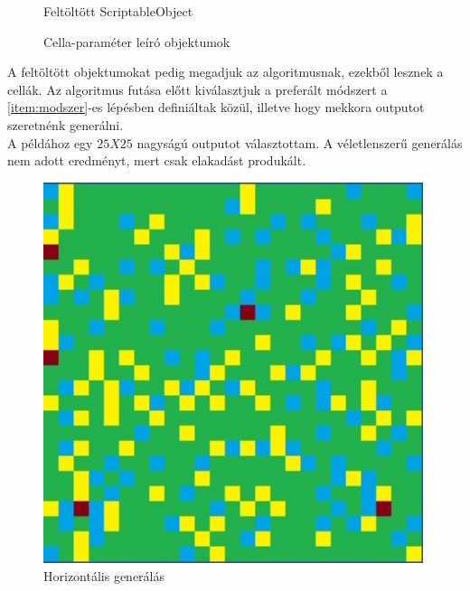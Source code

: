 \begin{figure}[h]
\begin{minipage}{.5\textwidth}
  \caption{Feltöltött ScriptableObject}
  \label{fig:teli-scriptable}
\end{minipage}
\caption*{Cella-paraméter leíró objektumok}
\end{figure}

A feltöltött objektumokat pedig megadjuk az algoritmusnak, ezekből lesznek a cellák.
\newpage
Az algoritmus futása előtt kiválasztjuk a preferált módszert a \ref{item:modszer}-es lépésben definiáltak közül, illetve hogy mekkora outputot szeretnénk generálni.\\
A példához egy $25X25$ nagyságú outputot választottam. A véletlenszerű generálás nem adott eredményt, mert csak elakadást produkált.
 \begin{figure}[h]
\centering
\begin{minipage}{.5\textwidth}
  \centering
  \includegraphics[width=0.99\textwidth]{images/horizontal.jpg}
  \caption{Horizontális generálás}
  \label{fig:wfc-horizontal}
\end{minipage}%
\begin{minipage}{.5\textwidth}
  \centering

\end{minipage}
\end{figure}
